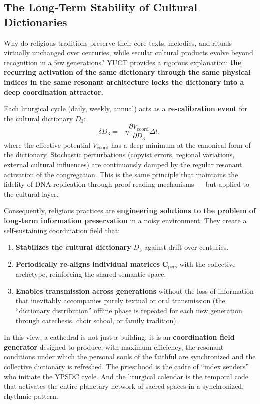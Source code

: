 \documentclass[12pt,a4paper]{article}
\begin{document}
	\subsection{The Long‑Term Stability of Cultural Dictionaries}
	
	Why do religious traditions preserve their core texts, melodies, and rituals virtually unchanged over centuries, while secular cultural products evolve beyond recognition in a few generations? YUCT provides a rigorous explanation: \textbf{the recurring activation of the same dictionary through the same physical indices in the same resonant architecture locks the dictionary into a deep coordination attractor.}
	
	Each liturgical cycle (daily, weekly, annual) acts as a \textbf{re‑calibration event} for the cultural dictionary \(D_3\):
	\begin{equation}
		\delta D_3 = -\eta \frac{\partial V_{\text{coord}}}{\partial D_3} \Delta t,
	\end{equation}
	where the effective potential \(V_{\text{coord}}\) has a deep minimum at the canonical form of the dictionary. Stochastic perturbations (copyist errors, regional variations, external cultural influences) are continuously damped by the regular resonant activation of the congregation. This is the same principle that maintains the fidelity of DNA replication through proof‑reading mechanisms — but applied to the cultural layer.
	
	Consequently, religious practices are \textbf{engineering solutions to the problem of long‑term information preservation} in a noisy environment. They create a self‑sustaining coordination field that:
	\begin{enumerate}
		\item \textbf{Stabilizes the cultural dictionary} \(D_3\) against drift over centuries.
		\item \textbf{Periodically re‑aligns individual matrices} \(\mathbf{C}_{\text{pers}}\) with the collective archetype, reinforcing the shared semantic space.
		\item \textbf{Enables transmission across generations} without the loss of information that inevitably accompanies purely textual or oral transmission (the ``dictionary distribution'' offline phase is repeated for each new generation through catechesis, choir school, or family tradition).
	\end{enumerate}
	
	In this view, a cathedral is not just a building; it is an \textbf{coordination field generator} designed to produce, with maximum efficiency, the resonant conditions under which the personal souls of the faithful are synchronized and the collective dictionary is refreshed. The priesthood is the cadre of ``index senders'' who initiate the YPSDC cycle. And the liturgical calendar is the temporal code that activates the entire planetary network of sacred spaces in a synchronized, rhythmic pattern.
	
\end{document}
